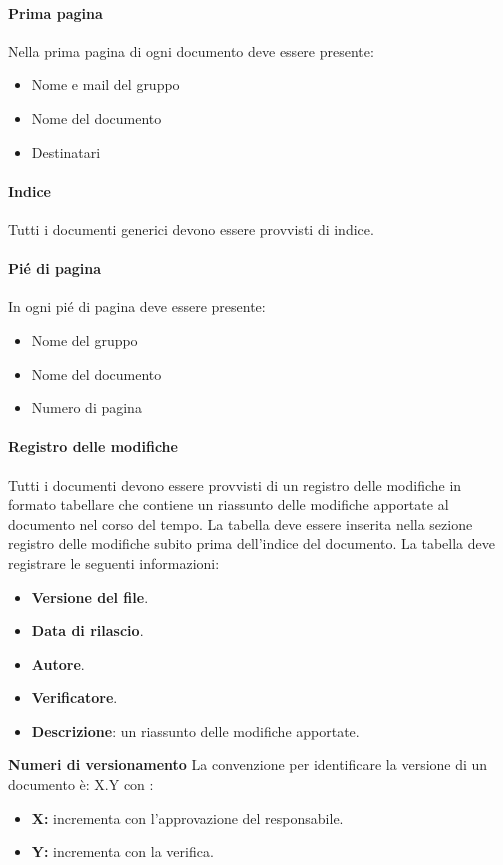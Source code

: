 \documentclass{article}
\begin{document}
\paragraph*{Prima pagina}
Nella prima pagina di ogni documento deve essere presente:
\begin{itemize}
    \item Nome e mail del gruppo
    \item Nome del documento 
    \item Destinatari
\end{itemize}
\paragraph*{Indice}
Tutti i documenti generici devono essere provvisti di indice.
\paragraph*{Pié di pagina}
In ogni pié di pagina deve essere presente:
\begin{itemize}
    \item Nome del gruppo
    \item Nome del documento 
    \item Numero di pagina
\end{itemize}
\paragraph*{Registro delle modifiche}\label{sec:RegistroModifiche}
Tutti i documenti devono essere provvisti di un registro delle modifiche in formato tabellare che contiene un riassunto
delle modifiche apportate al documento nel corso del tempo.
La tabella  deve essere inserita nella
sezione registro delle modifiche subito prima dell’indice del documento.
La tabella deve registrare le seguenti informazioni:
\begin{itemize}
\item \textbf{Versione del file}.
\item \textbf{Data di rilascio}.
\item \textbf{Autore}.
\item \textbf{Verificatore}.
\item \textbf{Descrizione}: un riassunto delle modifiche apportate.
\end{itemize}
\textbf{Numeri di versionamento}
 La convenzione per identificare la versione di un documento è: X.Y
con :
\begin{itemize}
 \item \textbf{X: }incrementa con l'approvazione del responsabile.
 \item \textbf{Y: }incrementa con la verifica.
\end{itemize}
\end{document}
